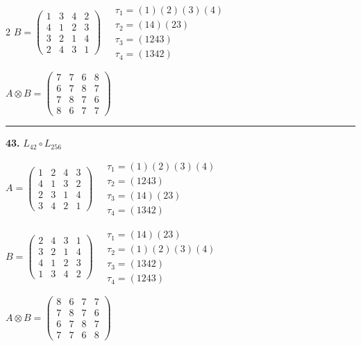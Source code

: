 \begin{multicols}{2}
$B = \begin{pmatrix} 1 & 3 & 4 & 2 \\ 4 & 1 & 2 & 3 \\ 3 & 2 & 1 & 4 \\ 2 & 4 & 3 & 1 \end{pmatrix} \quad \begin{matrix} \tau_{1}=(1)(2)(3)(4) \\ \tau_{2}=(1 4)(2 3) \\ \tau_{3}=(1 2 4 3) \\ \tau_{4}=(1 3 4 2) \end{matrix}$

$A \otimes B = \begin{pmatrix} 7 & 7 & 6 & 8 \\ 6 & 7 & 8 & 7 \\ 7 & 8 & 7 & 6 \\ 8 & 6 & 7 & 7 \end{pmatrix}$

\vspace{0.3em}
\hrule
\vspace{0.3em}

\noindent\textbf{43.} $L_{42} \circ L_{256}$

$A = \begin{pmatrix} 1 & 2 & 4 & 3 \\ 4 & 1 & 3 & 2 \\ 2 & 3 & 1 & 4 \\ 3 & 4 & 2 & 1 \end{pmatrix} \quad \begin{matrix} \tau_{1}=(1)(2)(3)(4) \\ \tau_{2}=(1 2 4 3) \\ \tau_{3}=(1 4)(2 3) \\ \tau_{4}=(1 3 4 2) \end{matrix}$

$B = \begin{pmatrix} 2 & 4 & 3 & 1 \\ 3 & 2 & 1 & 4 \\ 4 & 1 & 2 & 3 \\ 1 & 3 & 4 & 2 \end{pmatrix} \quad \begin{matrix} \tau_{1}=(1 4)(2 3) \\ \tau_{2}=(1)(2)(3)(4) \\ \tau_{3}=(1 3 4 2) \\ \tau_{4}=(1 2 4 3) \end{matrix}$

$A \otimes B = \begin{pmatrix} 8 & 6 & 7 & 7 \\ 7 & 8 & 7 & 6 \\ 6 & 7 & 8 & 7 \\ 7 & 7 & 6 & 8 \end{pmatrix}$


\end{multicols}
